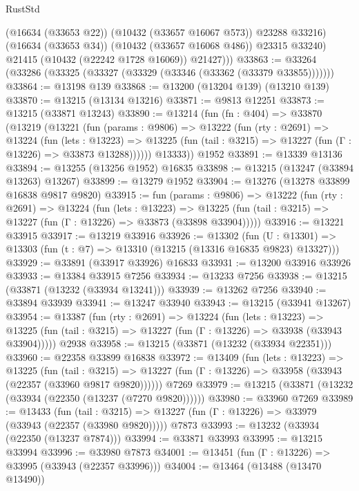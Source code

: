 \begin{lexlean}{RustStd}
\begin{coremodule}
              (@16634 (@33653 @22))
              (@10432 (@33657 @16067 @573))
              @23288
              @33216)
            (@16634 (@33653 @34))
            (@10432 (@33657 @16068 @486))
            @23315
            @33240)
          @21415
          (@10432 (@22242 @1728 @16069))
          @21427)))
@33863 := @33264 (@33286 (@33325 (@33327 (@33329 (@33346 (@33362 (@33379 @33855)))))))
@33864 := @13198 @139
@33868 := @13200 (@13204 @139) (@13210 @139)
@33870 := @13215 (@13134 @13216)
@33871 := @9813 @12251
@33873 := @13215 (@33871 @13243)
@33890 := @13214
    (fun (fn : @404) =>
    @33870
      (@13219
        (@13221
          (fun (params : @9806) =>
          @13222
            (fun (rty : @2691) =>
            @13224
              (fun (lets : @13223) =>
              @13225 (fun (tail : @3215) => @13227 (fun (Γ : @13226) => @33873 @13288))))))
        @13333))
    @1952
@33891 := @13339 @13136
@33894 := @13255 (@13256 @1952) @16835
@33898 := @13215 (@13247 (@33894 @13263) @13267)
@33899 := @13279 @1952
@33904 := @13276 (@13278 @33899 @16838 @9817 @9820)
@33915 := fun (params : @9806) =>
  @13222
    (fun (rty : @2691) =>
    @13224
      (fun (lets : @13223) =>
      @13225 (fun (tail : @3215) => @13227 (fun (Γ : @13226) => @33873 (@33898 @33904)))))
@33916 := @13221 @33915
@33917 := @13219 @33916
@33926 := @13302
    (fun (U : @13301) => @13303 (fun (t : @7) => @13310 (@13215 (@13316 @16835 @9823) @13327)))
@33929 := @33891 (@33917 @33926) @16833
@33931 := @13200 @33916 @33926
@33933 := @13384 @33915 @7256
@33934 := @13233 @7256
@33938 := @13215 (@33871 (@13232 (@33934 @13241)))
@33939 := @13262 @7256
@33940 := @33894 @33939
@33941 := @13247 @33940
@33943 := @13215 (@33941 @13267)
@33954 := @13387
    (fun (rty : @2691) =>
    @13224
      (fun (lets : @13223) =>
      @13225 (fun (tail : @3215) => @13227 (fun (Γ : @13226) => @33938 (@33943 @33904)))))
    @2938
@33958 := @13215 (@33871 (@13232 (@33934 @22351)))
@33960 := @22358 @33899 @16838
@33972 := @13409
    (fun (lets : @13223) =>
    @13225
      (fun (tail : @3215) =>
      @13227 (fun (Γ : @13226) => @33958 (@33943 (@22357 (@33960 @9817 @9820))))))
    @7269
@33979 := @13215 (@33871 (@13232 (@33934 (@22350 (@13237 (@7270 @9820))))))
@33980 := @33960 @7269
@33989 := @13433
    (fun (tail : @3215) => @13227 (fun (Γ : @13226) => @33979 (@33943 (@22357 (@33980 @9820)))))
    @7873
@33993 := @13232 (@33934 (@22350 (@13237 @7874)))
@33994 := @33871 @33993
@33995 := @13215 @33994
@33996 := @33980 @7873
@34001 := @13451 (fun (Γ : @13226) => @33995 (@33943 (@22357 @33996)))
@34004 := @13464 (@13488 (@13470 @13490))

\end{coremodule}
\end{lexlean}
